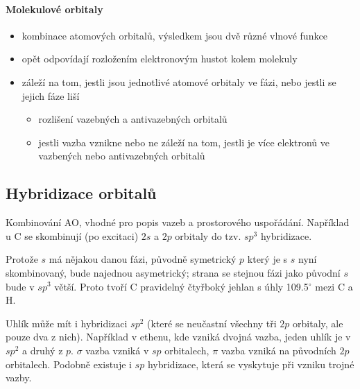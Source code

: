 \documentclass[DIV=8]{scrreprt}
\begin{document}
\paragraph{Molekulové orbitaly}
\begin{itemize}[nosep]
    \item kombinace atomových orbitalů, výsledkem jsou dvě různé vlnové funkce
    \item opět odpovídají rozložením elektronovým hustot kolem molekuly
    \item záleží na tom, jestli jsou jednotlivé atomové orbitaly ve fázi, nebo jestli se jejich fáze liší
\begin{itemize}[nosep]
    \item rozlišení vazebných a antivazebných orbitalů
    \item jestli vazba vznikne nebo ne záleží na tom, jestli je více elektronů ve vazbených nebo antivazebných orbitalů
\end{itemize}

\end{itemize}



\subsection{Hybridizace orbitalů} \label{Hybridizace orbitalů}


Kombinování AO, vhodné pro popis vazeb a prostorového uspořádání. Například u C se skombinují (po excitaci) \(2s\) a \(2p\) orbitaly do tzv. \(sp^3\) hybridizace.

Protože \(s\) má nějakou danou fázi, původně symetrický \(p\) který je s \(s\) nyní skombinovaný, bude najednou asymetrický; strana se stejnou fázi jako původní \(s\) bude v \(sp^3\) větší.
Proto tvoří C pravidelný čtyřboký jehlan s úhly 109.5\(^{\circ}\) mezi C a H.

Uhlík může mít i hybridizaci \(sp^2\) (které se neučastní všechny tři \(2p\) orbitaly, ale pouze dva z nich). Například v ethenu, kde vzniká dvojná vazba, jeden uhlík je v \(sp^2\) a druhý z \(p\). \(\sigma\) vazba vzniká v \(sp\) orbitalech, \(\pi\) vazba vzniká na původních \(2p\) orbitalech. Podobně existuje i \(sp\) hybridizace, která se vyskytuje při vzniku trojné vazby.
\end{document}
